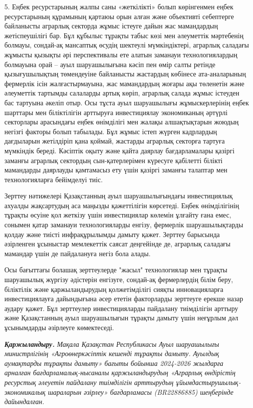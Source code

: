 {{5. Еңбек ресурстарының жалпы саны «жеткілікті» болып көрінгенмен еңбек
ресурстарының құрамының қартаюы орын алған және объективті себептерге
байланысты аграрлық секторда жұмыс істеуге дайын жас мамандардың
жетіспеушілігі бар. Бұл құбылыс тұрақты табыс көзі мен әлеуметтік
мәртебенің болмауы, сондай-ақ мансаптық өсудің шектеулі мүмкіндіктері,
аграрлық саладағы жұмысты қызықты әрі перспективалы ете алатын заманауи
технологиялардың болмауына орай -- ауыл шаруашылығына кәсіп пен өмір
салты ретінде қызығушылықтың төмендеуіне байланысты жастардың көбінесе
ата-аналарының фермерлік ісін жалғастырмауына, жас мамандардың жоғары
ақы төленетін және әлеуметтік тартымды салаларды артық көріп, аграрлық
салада жұмыс істеуден бас тартуына әкеліп отыр. Осы тұста ауыл
шаруашылығы жұмыскерлерінің еңбек шарттары мен біліктілігін арттыруға
инвестициялау экономиканың әртүрлі секторлары арасындағы еңбек
өнімділігі мен жалақы алшақтықтарын жоюдың негізгі факторы болып
табылады. Бұл жұмыс істеп жүрген кадрлардың дағдыларын жетілдіріп қана
қоймай, жастарды аграрлық секторға тартуға мүмкіндік береді. Кәсіптік
оқыту және қайта даярлау бағдарламалары қазіргі заманғы аграрлық
сектордың сын-қатерлерімен күресуге қабілетті білікті мамандарды
даярлауды қамтамасыз ету үшін қазіргі заманғы талаптар мен
технологияларға бейімделуі тиіс.

Зерттеу нәтижелері Қазақстанның ауыл шаруашылығындағы инвестициялық
ахуалды жақсартудың аса маңызды қажеттілігін көрсетеді. Еңбек
өнімділігінің тұрақты өсуіне қол жеткізу үшін инвестициялар көлемін
ұлғайту ғана емес, сонымен қатар заманауи технологияларды енгізу,
фермерлік шаруашылықтарды қолдау және тиісті инфрақұрылымды дамыту
қажет. Зерттеу барысында әзірленген ұсыныстар мемлекеттік саясат
деңгейінде де, аграрлық саладағы мамандар үшін де пайдалануға негіз бола
алады.

Осы бағыттағы болашақ зерттеулерде "жасыл" технологиялар мен тұрақты
шаруашылық жүргізу әдістерін енгізуге, сондай-ақ фермерлердің білім
беру, біліктілік және қаржыландырудың қолжетімділігі сияқты
инновацияларға инвестициялауға дайындығына әсер ететін факторларды
зерттеуге ерекше назар аудару қажет. Бұл зерттеулер инвестицияларды
пайдалану тиімділігін арттыру және Қазақстанның ауыл шаруашылығын
тұрақты дамыту үшін неғұрлым дәл ұсынымдарды әзірлеуге көмектеседі.

\emph{{\bfseries Қаржыландыру.}} \emph{Мақала Қазақстан Республикасы Ауыл
шаруашылығы министрлігінің «Агроөнеркәсіптік кешенді тұрақты дамыту.
Ауылдық аумақтарды тұрақты дамыту» бағыты бойынша 2024-2026 жылдарға
арналған бағдарламалық-нысаналы қаржыландырудың «Аграрлық өндірістің
ресурстық әлеуетін пайдалану тиімділігін арттырудың
ұйымдастырушылық-экономикалық шараларын әзірлеу» бағдарламасы
(BR22886885) шеңберінде дайындалған.}

}}

